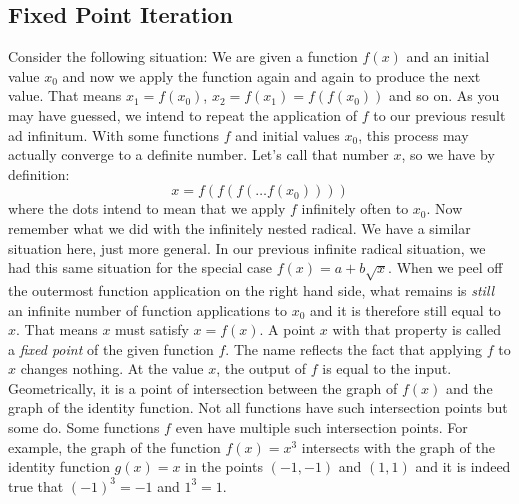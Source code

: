 



\subsection{Fixed Point Iteration}
Consider the following situation: We are given a function $f(x)$ and an initial value $x_0$ and now we apply the function again and again to produce the next value. That means $x_1 = f(x_0)$, $x_2 = f(x_1) = f(f(x_0))$ and so on. As you may have guessed, we intend to repeat the application of $f$ to our previous result ad infinitum. With some functions $f$ and initial values $x_0$, this process may actually converge to a definite number. Let's call that number $x$, so we have by definition:
\begin{equation}
 x = f(f(f( \ldots f(x_0))))
\end{equation}
where the dots intend to mean that we apply $f$ infinitely often to $x_0$. Now remember what we did with the infinitely nested radical. We have a similar situation here, just more general. In our previous infinite radical situation, we had this same situation for the special case $f(x) = a + b \sqrt{x}$. When we peel off the outermost function application on the right hand side, what remains is \emph{still} an infinite number of function applications to $x_0$ and it is therefore still equal to $x$. That means $x$ must satisfy $x = f(x)$. A point $x$ with that property is called a \emph{fixed point} of the given function $f$. The name reflects the fact that applying $f$ to $x$ changes nothing. At the value $x$, the output of $f$ is equal to the input. Geometrically, it is a point of intersection between the graph of $f(x)$ and the graph of the identity function. Not all functions have such intersection points but some do. Some functions $f$ even have multiple such intersection points. For example, the graph of the function $f(x) = x^3$ intersects with the graph of the identity function $g(x) = x$ in the points $(-1,-1)$ and $(1,1)$ and it is indeed true that $(-1)^3 = -1$ and $1^3 = 1$.

